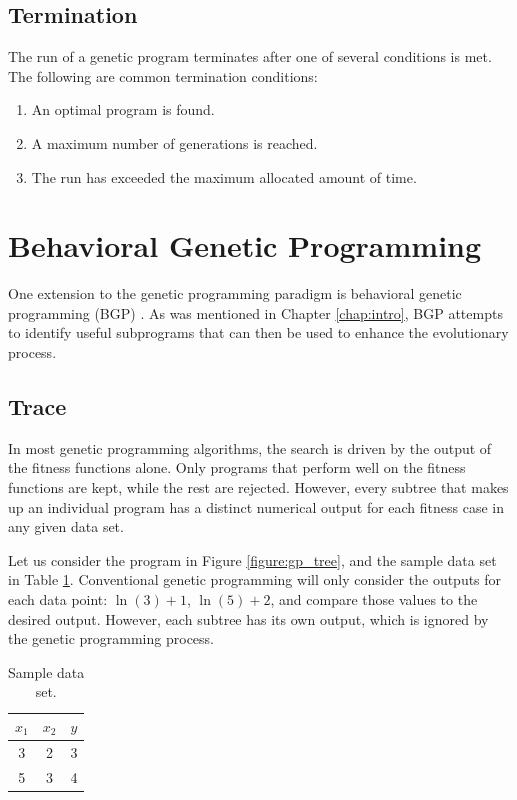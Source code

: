 \subsection{Termination}
The run of a genetic program terminates after one of several conditions is met.  The following are common termination conditions:
\begin{enumerate}[noitemsep]
\item An optimal program is found.
\item A maximum number of generations is reached.
\item The run has exceeded the maximum allocated amount of time.
\end{enumerate}

\section{Behavioral Genetic Programming}
One extension to the genetic programming paradigm is behavioral genetic programming (BGP) \cite{krawiec}.  As was mentioned in Chapter \ref{chap:intro}, BGP attempts to identify useful subprograms that can then be used to enhance the evolutionary process.

\subsection{Trace}
In most genetic programming algorithms, the search is driven by the output of the fitness functions alone.  Only programs that perform well on the fitness functions are kept, while the rest are rejected.  However, every subtree that makes up an individual program has a distinct numerical output for each fitness case in any given data set.

Let us consider the program in Figure \ref{figure:gp_tree}, and the sample data set in Table \ref{table:sample_data}.  Conventional genetic programming will only consider the outputs for each data point: $\ln(3) + 1$, $\ln(5) + 2$, and compare those values to the desired output.  However, each subtree has its own output, which is ignored by the genetic programming process.

\begin{table}[ht]
\centering
\begin{tabular}{ c c | c }
\hline\hline
$x_{1}$ & $x_{2}$ & $y$ \\ [0.5ex]
\hline
3 & 2 & 3 \\
5 & 3 & 4 \\[1ex]
\hline
\end{tabular}
\caption{Sample data set.}
\label{table:sample_data}
\end{table}

